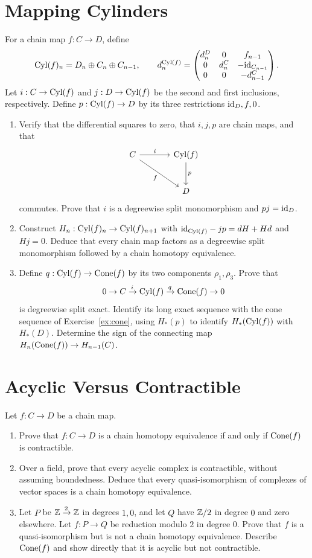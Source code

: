 \documentclass[11pt]{article}
\begin{document}
\section{Mapping Cylinders}\label{ex:cylinder}
For a chain map $f:C\to D$, define
\[
\operatorname{Cyl}(f)_n=D_n\oplus C_n\oplus C_{n-1},\qquad
 d^{\operatorname{Cyl}(f)}_n=
 \begin{pmatrix}
 d^D_n&0&f_{n-1}\\
 0&d^C_n&-\mathrm{id}_{C_{n-1}}\\
 0&0&-d^C_{n-1}
 \end{pmatrix}.
\]
Let $i:C\to\operatorname{Cyl}(f)$ and $j:D\to\operatorname{Cyl}(f)$ be the second and first inclusions, respectively. Define $p:\operatorname{Cyl}(f)\to D$ by its three restrictions $\mathrm{id}_D,f,0$.
\begin{enumerate}
\item Verify that the differential squares to zero, that $i,j,p$ are chain maps, and that
\[
\begin{tikzcd}[row sep=large,column sep=large]
C\arrow[r,"i"]\arrow[dr,"f"']&\Cyl(f)\arrow[d,"p"]\\
&D
\end{tikzcd}
\]
commutes. Prove that $i$ is a degreewise split monomorphism and $pj=\mathrm{id}_D$.
\item Construct $H_n:\operatorname{Cyl}(f)_n\to\operatorname{Cyl}(f)_{n+1}$ with
$\mathrm{id}_{\operatorname{Cyl}(f)}-jp=dH+Hd$ and $Hj=0$.
Deduce that every chain map factors as a degreewise split monomorphism followed by a chain homotopy equivalence.
\item Define $q:\operatorname{Cyl}(f)\to\operatorname{Cone}(f)$ by its two components $\rho_1,\rho_3$. Prove that
\[
0\to C\xrightarrow{i}\operatorname{Cyl}(f)\xrightarrow{q}\operatorname{Cone}(f)\to0
\]
is degreewise split exact. Identify its long exact sequence with the cone sequence of Exercise~\ref{ex:cone}, using $H_*(p)$ to identify $H_*(\operatorname{Cyl}(f))$ with $H_*(D)$. Determine the sign of the connecting map $H_n(\operatorname{Cone}(f))\to H_{n-1}(C)$.
\end{enumerate}


\section{Acyclic Versus Contractible}\label{ex:criterion}
Let $f:C\to D$ be a chain map.
\begin{enumerate}
\item Prove that $f:C\to D$ is a chain homotopy equivalence if and only if $\operatorname{Cone}(f)$ is contractible.
\item Over a field, prove that every acyclic complex is contractible, without assuming boundedness. Deduce that every quasi-isomorphism of complexes of vector spaces is a chain homotopy equivalence.
\item Let $P$ be $\mathbb Z\xrightarrow{2}\mathbb Z$ in degrees $1,0$, and let $Q$ have $\mathbb Z/2$ in degree $0$ and zero elsewhere. Let $f:P\to Q$ be reduction modulo $2$ in degree $0$. Prove that $f$ is a quasi-isomorphism but is not a chain homotopy equivalence. Describe $\operatorname{Cone}(f)$ and show directly that it is acyclic but not contractible.
\end{enumerate}
\end{document}
